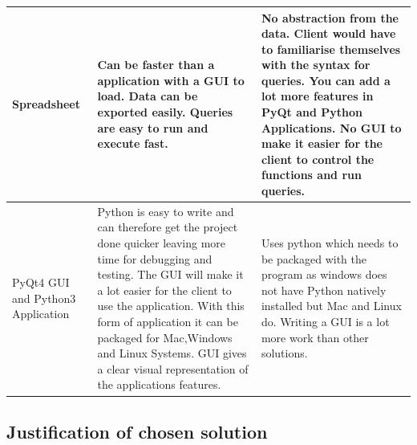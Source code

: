 \begin{flushleft}
\begin{longtable}{|p{3cm}|p{4cm}|p{4cm}|}
Spreadsheet &

Can be faster than a application with a GUI to load.
Data can be exported easily.
Queries are easy to run and execute fast. &

No abstraction from the data.
Client would have to familiarise themselves with the syntax for queries.
You can add a lot more features in PyQt and Python Applications.
No GUI to make it easier for the client to control the functions and run queries. 

\\ \hline

PyQt4 GUI and Python3 Application &

Python is easy to write and can therefore get the project done quicker leaving more time for debugging and testing.
The GUI will make it a lot easier for the client to use the application.
With this form of application it can be packaged for Mac,Windows and Linux Systems.
GUI gives a clear visual representation of the applications features. &

Uses python which needs to be packaged with the program as windows does not have Python natively installed but Mac and Linux do.
Writing a GUI is a lot more work than other solutions. 

\\ \hline

\end{longtable}
\label{tab:Alternative Solutions to the problem}
\end{flushleft}



\subsection{Justification of chosen solution}

